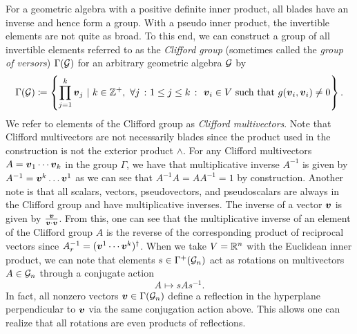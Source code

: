 For a geometric algebra with a positive definite inner product, all blades have an inverse and hence form a group. With a pseudo inner product, the invertible elements are not quite as broad. To this end, we can construct a group of all invertible elements referred to as the \emph{Clifford group} (sometimes called the \emph{group of versors}) $\Gamma(\mathcal{G})$ for an arbitrary geometric algebra $\mathcal{G}$ by
\begin{equation}
\Gamma(\mathcal{G}) \coloneqq \left\{ \prod_{j=1}^k \boldsymbol{v}_j ~\vert~ k\in \mathbb{Z}^+,~ \forall j~\colon1\leq j \leq k~\colon~\boldsymbol{v}_i \in V ~\textrm{such that}~ g(\boldsymbol{v}_i,\boldsymbol{v}_i)\neq 0\right\}.
\end{equation}
We refer to elements of the Clifford group as \emph{Clifford multivectors}. Note that Clifford multivectors are not necessarily blades since the product used in the construction is not the exterior product $\wedge$. For any Clifford multivectors $A = \boldsymbol{v}_1 \cdots \boldsymbol{v}_k$ in the group $\Gamma$, we have that multiplicative inverse $A^{-1}$ is given by $A^{-1} = \boldsymbol{v}^k \dots \boldsymbol{v}^1$ as we can see that $A^{-1}A=AA^{-1} = 1$ by construction.  Another note is that all scalars, vectors, pseudovectors, and pseudoscalars are always in the Clifford group and have multiplicative inverses. The inverse of a vector $\boldsymbol{v}$ is given by $\frac{\boldsymbol{v}}{\boldsymbol{v}\cdot\boldsymbol{v}}$. From this, one can see that the multiplicative inverse of an element of the Clifford group $A$ is the reverse of the corresponding product of reciprocal vectors since $A_r^{-1} = (\boldsymbol{v}^1 \cdots \boldsymbol{v}^k)^\dagger$. When we take $V=\mathbb{R}^n$ with the Euclidean inner product, we can note that elements $s \in \Gamma^+(\mathcal{G}_n)$ act as rotations on multivectors $A\in \mathcal{G}_n$ through a conjugate action
\begin{equation}
A \mapsto s A s^{-1}.
\end{equation}
In fact, all nonzero vectors $\boldsymbol{v}\in\Gamma(\mathcal{G}_n)$ define a reflection in the hyperplane perpendicular to $\boldsymbol{v}$ via the same conjugation action above. This allows one can realize that all rotations are even products of reflections.

